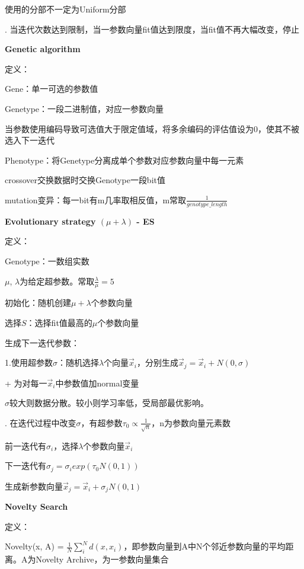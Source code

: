 \documentclass[UTF8]{ctexart}
\begin{document}
  \quad \quad \quad 使用的分部不一定为Uniform分部

  . 当迭代次数达到限制，当一参数向量fit值达到限度，当fit值不再大幅改变，停止

  \textbf{Genetic algorithm}
  
  \quad 定义：

  \quad \quad Gene：单一可选的参数值
  
  \quad \quad Genetype：一段二进制值，对应一参数向量
  
  \quad \quad \quad 当参数使用编码导致可选值大于限定值域，将多余编码的评估值设为0，使其不被选入下一迭代

  \quad \quad Phenotype：将Genetype分离成单个参数对应参数向量中每一元素

  \quad crossover交换数据时交换Genotype一段bit值

  \quad mutation变异：每一bit有m几率取相反值，m常取$\frac{1}{genotype\_length}$

  \textbf{Evolutionary strategy $(\mu + \lambda)$ - ES}

  \quad 定义： 

  \quad \quad Genotype：一数组实数

  \quad \quad $\mu$, $\lambda$为给定超参数。常取$\frac{\lambda}{\mu} = 5$

  \quad 初始化：随机创建$\mu + \lambda$个参数向量

  \quad 选择$S$：选择fit值最高的$\mu$个参数向量

  \quad 生成下一迭代参数：
  
  \quad \quad 1.使用超参数$\sigma$：随机选择$\lambda$个向量$\vec{x}_i$，分别生成$\vec{x}_j = \vec{x}_i + N(0, \sigma)$

  \quad \quad \quad + 为对每一$\vec{x}_i$中参数值加normal变量

  \quad \quad \quad $\sigma$较大则数据分散。较小则学习率低，受局部最优影响。

  \quad {}. 在迭代过程中改变$\sigma$，有超参数$\tau_0 \propto \frac{1}{\sqrt{n}}$，n为参数向量元素数

  \quad \quad \quad 前一迭代有$\sigma_i$，选择$\lambda$个参数向量$\vec{x}_i$

  \quad \quad \quad 下一迭代有$\sigma_j = \sigma_i exp(\tau_0N(0, 1))$

  \quad \quad \quad 生成新参数向量$\vec{x}_j = \vec{x}_i + \sigma_jN(0, 1)$

  \textbf{Novelty Search}

  \quad 定义：
  
  \quad \quad Novelty(x, A) = $\frac{1}{N}\sum_i^{N}d(x, x_i)$，即参数向量到A中N个邻近参数向量的平均距离。A为Novelty Archive，为一参数向量集合
\end{document}
